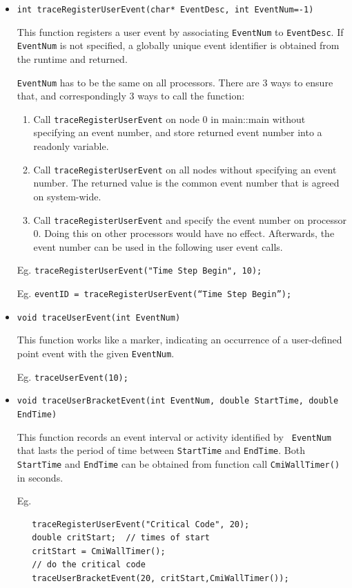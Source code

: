\documentclass[10pt]{article}
\begin{document}
\begin{itemize}
\item
{\tt int traceRegisterUserEvent(char* EventDesc, int EventNum=-1) }

This function registers a user event by associating {\tt EventNum} to
{\tt EventDesc}. If {\tt EventNum} is not specified, a globally unique
event identifier is obtained from the runtime and returned.

{\tt EventNum} has to be the same on all processors. There are 3 ways
to ensure that, and correspondingly 3 ways to call the function:

\begin{enumerate}
\item
Call {\tt traceRegisterUserEvent} on node 0 in main::main without specifying
an event number, and store returned event number into a readonly variable.
\item
Call {\tt traceRegisterUserEvent} on all nodes without specifying an
event number. The returned value is the common event number that is
agreed on system-wide.
\item
Call {\tt traceRegisterUserEvent} and specify the event number on
processor 0. Doing this on other processors would have no
effect. Afterwards, the event number can be used in the following user
event calls.
\end{enumerate}

Eg. {\tt traceRegisterUserEvent("Time Step Begin", 10);}

Eg. {\tt eventID = traceRegisterUserEvent(``Time Step Begin'');}

\item
{\tt void traceUserEvent(int EventNum) }

This function works like a marker, indicating an occurrence of a
user-defined point event with the given {\tt EventNum}.

Eg. {\tt traceUserEvent(10);}

\item
{\tt void traceUserBracketEvent(int EventNum, double StartTime, double EndTime) }

This function records an event interval or activity identified by {\tt
EventNum} that lasts the period of time between {\tt StartTime} and
{\tt EndTime}. Both {\tt StartTime} and {\tt EndTime} can be obtained
from function call {\tt CmiWallTimer()} in seconds.

Eg.
\begin{verbatim}
   traceRegisterUserEvent("Critical Code", 20);
   double critStart;  // times of start
   critStart = CmiWallTimer();
   // do the critical code
   traceUserBracketEvent(20, critStart,CmiWallTimer());
\end{verbatim}

\end{itemize}
\end{document}
